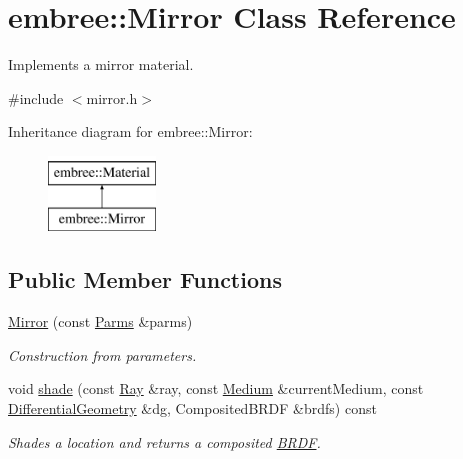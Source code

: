 \hypertarget{classembree_1_1_mirror}{
\section{embree::Mirror Class Reference}
\label{classembree_1_1_mirror}
}


Implements a mirror material.  




{\ttfamily \#include $<$mirror.h$>$}

Inheritance diagram for embree::Mirror:\begin{figure}[H]
\begin{center}
\leavevmode
\includegraphics[height=2.000000cm]{classembree_1_1_mirror}
\end{center}
\end{figure}
\subsection*{Public Member Functions}
\begin{DoxyCompactItemize}
\item 
\hyperlink{classembree_1_1_mirror_a7edcfe18d0f089e2cbdd9ae60404e497}{Mirror} (const \hyperlink{classembree_1_1_parms}{Parms} \&parms)
\begin{DoxyCompactList}\small\item\em Construction from parameters. \item\end{DoxyCompactList}\item 
\hypertarget{classembree_1_1_mirror_ae46c2ccf317c491ca7ecaca5d1f3f557}{
void \hyperlink{classembree_1_1_mirror_ae46c2ccf317c491ca7ecaca5d1f3f557}{shade} (const \hyperlink{structembree_1_1_ray}{Ray} \&ray, const \hyperlink{classembree_1_1_medium}{Medium} \&currentMedium, const \hyperlink{structembree_1_1_differential_geometry}{DifferentialGeometry} \&dg, CompositedBRDF \&brdfs) const }
\label{classembree_1_1_mirror_ae46c2ccf317c491ca7ecaca5d1f3f557}

\begin{DoxyCompactList}\small\item\em Shades a location and returns a composited \hyperlink{classembree_1_1_b_r_d_f}{BRDF}. \item\end{DoxyCompactList}\end{DoxyCompactItemize}


